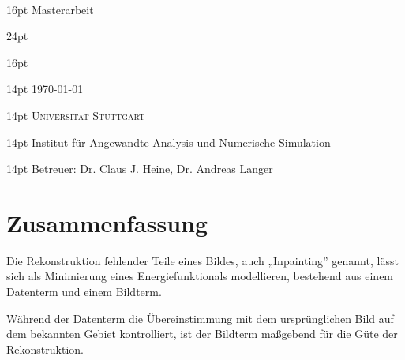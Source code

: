 
\begin{titlepage}
  \begin{center}
    ~\par\vspace{4em}
    {
      \fontsize { 16pt } { 16pt } \selectfont
      Masterarbeit
    }
    \par\vspace{3em}
    {
      \fontsize { 24pt } { 24pt } \selectfont \sffamily \bfseries
      \thetitle
    }
    \par\vspace{3em}
    {
      \fontsize { 16pt } { 16pt } \selectfont \scshape
      \theauthor
    }
    \par\vspace{1.5em}
    {
      \fontsize { 14pt } { 14pt } \selectfont %
      \today
    }
    \par\vspace{4.5em}
    {
    }
    \par\vspace{8em}
    {
      \fontsize { 14pt } { 14pt } \selectfont \scshape
      Universität Stuttgart
    }
    \par\vspace{1em}
    {
      \fontsize { 14pt } { 14pt } \selectfont %
      Institut für Angewandte Analysis und Numerische Simulation
    }
    \par\vspace{1em}
    {
      \fontsize { 14pt } { 14pt } \selectfont %
      Betreuer:
      Dr. Claus J. Heine,
      Dr. Andreas Langer
    }
  \end{center}
\end{titlepage}

\chapter*{Zusammenfassung}

Die Rekonstruktion fehlender Teile eines Bildes, auch „Inpainting” genannt, lässt sich als Minimierung eines
Energiefunktionals modellieren, bestehend aus einem Datenterm und einem Bildterm.

Während der Datenterm die Übereinstimmung mit dem ursprünglichen Bild auf dem bekannten Gebiet kontrolliert, ist der Bildterm
maßgebend für die Güte der Rekonstruktion.


{
  \let\clearpage\relax
  \tableofcontents
}

